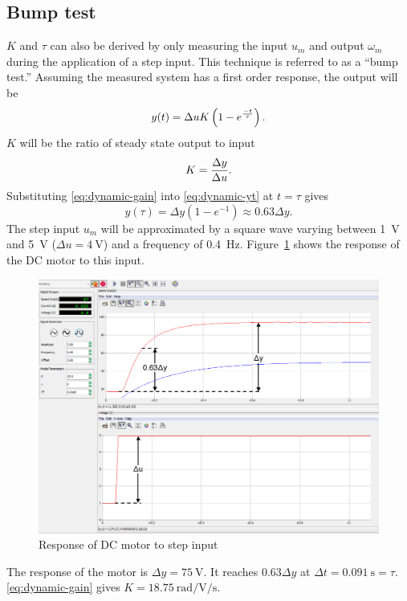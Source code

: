 \subsection{Bump test}\label{sec:bump}
$K$ and $\tau$ can also be derived by only measuring the input $u_m$ and output $\omega_m$ during the application of a step input.
This technique is referred to as a ``bump test.''
Assuming the measured system has a first order response, the output will be
\begin{equation}\label{eq:dynamic-yt}
  y(t) = \Delta u K \left(1 - e^{{-t \over \tau}}\right).
\end{equation}
$K$ will be the ratio of steady state output to input
\begin{equation}\label{eq:dynamic-gain}
  K = {\Delta y \over \Delta u}.
\end{equation}
Substituting \eqref{eq:dynamic-gain} into \eqref{eq:dynamic-yt} at $t = \tau$ gives
\begin{equation}\label{eq:dynamic-tau}
  y(\tau) = \Delta y \left(1 - e^{-1}\right) \approx 0.63 \Delta y.
\end{equation}
The step input $u_m$ will be approximated by a square wave varying between \SI{1}{\volt} and \SI{5}{\volt} ($\Delta u = \SI{4}{\volt}$) and a frequency of \SI{0.4}{\hertz}.
Figure~\ref{fig:step} shows the response of the DC motor to this input.
\pagebreak
\begin{figure}[tbph]
  \centering
  \includegraphics[width=0.95\linewidth]{graphics/part3}
  \caption{Response of DC motor to step input}
  \label{fig:step}
\end{figure}

The response of the motor is $\Delta y = \SI{75}{\volt}$.
It reaches $0.63 \Delta y$ at $\Delta t = \SI{0.091}{\second} = \tau$. \eqref{eq:dynamic-gain} gives $K = \SI{18.75}{\radian\per\volt\per\second}$.


